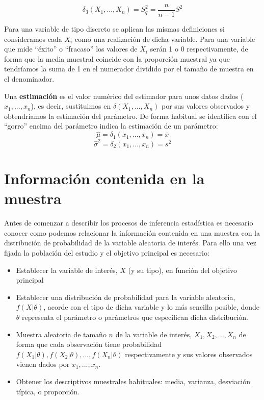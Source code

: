 \documentclass[
]{book}
\providecommand{\tightlist}{%
  \setlength{\itemsep}{0pt}\setlength{\parskip}{0pt}}
\begin{document}
\[\delta_3(X_1,...,X_n) = S_q^2 = \frac{n}{n-1} S^2\]

Para una variable de tipo discreto se aplican las mismas definiciones si consideramos cada \(X_i\) como una realización de dicha variable. Para una variable que mide ``éxito'' o ``fracaso'' los valores de \(X_i\) serán 1 o 0 respectivamente, de forma que la media muestral coincide con la proporción muestral ya que tendríamos la suma de 1 en el numerador dividido por el tamaño de muestra en el denominador.

Una \textbf{estimación} es el valor numérico del estimador para unos datos dados (\(x_1,...,x_n\)), es decir, sustituimos en \(\delta(X_1,...,X_n)\) por sus valores observados y obtendríamos la estimación del parámetro. De forma habitual se identifica con el ``gorro'' encima del parámetro indica la estimación de un parámetro: \[\hat{\mu} = \delta_1(x_1,...,x_n) =\bar{x}\] \[\hat{\sigma}^2 = \delta_2(x_1,...,x_n)= s^2\]

\hypertarget{informaciuxf3n-contenida-en-la-muestra}{%
\section{Información contenida en la muestra}\label{informaciuxf3n-contenida-en-la-muestra}}

Antes de comenzar a describir los procesos de inferencia estadística es necesario conocer como podemos relacionar la información contenida en una muestra con la distribución de probabilidad de la variable aleatoria de interés. Para ello una vez fijada la población del estudio y el objetivo principal es necesario:

\begin{itemize}
\tightlist
\item
  Establecer la variable de interés, \(X\) (y su tipo), en función del objetivo principal
\item
  Establecer una distribución de probabilidad para la variable aleatoria, \(f(X | \theta)\), acorde con el tipo de dicha variable y lo más sencilla posible, donde \(\theta\) representa el parámetro o parámetros que especifican dicha distribución.
\item
  Muestra aleatoria de tamaño \(n\) de la variable de interés, \(X_1, X_2,...,X_n\) de forma que cada observación tiene probabilidad \(f(X_1 | \theta), f(X_2 | \theta),...,f(X_n | \theta)\) respectivamente y sus valores observados vienen dados por \(x_1,...,x_n\).
\item
  Obtener los descriptivos muestrales habituales: media, varianza, desviación típica, o proporción.
\end{itemize}
\end{document}
